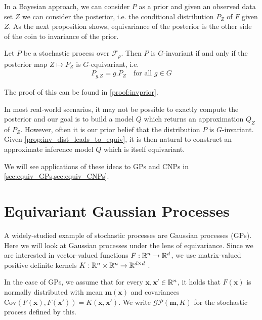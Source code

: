 In a Bayesian approach, we can consider $P$ as a prior and given an observed data set $Z$ we can consider the posterior, i.e. the conditional distribution $P_{Z}$ of $F$ given $Z$.
As the next proposition shows, equivariance of the posterior is the other side of the coin to invariance of the prior.
\begin{proposition}
	\label{prop:inv_dist_leads_to_equiv}
	Let $P$ be a stochastic process over $\mathcal{F}_\rho$.
	Then $P$ is $G$-invariant if and only if the posterior map $Z\mapsto P_Z$ is $G$-equivariant, i.e. \begin{align} P_{g.Z}=g.P_{Z} \quad\text{for all } g\in G \end{align} \end{proposition} The proof of this can be found in \cref{proof:invprior}.

In most real-world scenarios, it may not be possible to exactly compute the posterior and our goal is to build a model $Q$ which returns an approximation $Q_Z$ of $P_Z$.
However, often it is our prior belief that the distribution $P$ is $G$-invariant.
Given \cref{prop:inv_dist_leads_to_equiv}, it is then natural to construct an approximate inference model $Q$ which is itself equivariant.

We will see applications of these ideas to GPs and CNPs in \cref{sec:equiv_GPs,sec:equiv_CNPs}.

\section{Equivariant Gaussian Processes}
\label{sec:equiv_GPs}
A widely-studied example of stochastic processes are Gaussian processes (GPs).
Here we will look at Gaussian processes under the lens of equivariance.
Since we are interested in vector-valued functions $F:\mathbb{R}^n\to\mathbb{R}^d$, we use matrix-valued positive definite kernels $K:\mathbb{R}^n\times\mathbb{R}^n\to\mathbb{R}^{d\times d}$ \parencite{Review_matrix_kernels}.

In the case of GPs, we assume that for every $\mathbf{x},\mathbf{x}'\in\mathbb{R}^n$, it holds that $F(\mathbf{x})$ is normally distributed with mean $\mathbf{m}(\mathbf{x})$ and covariances $\text{Cov}(F(\mathbf{x}),F(\mathbf{x}'))=K(\mathbf{x},\mathbf{x}')$.
We write $\mathcal{GP}(\mathbf{m},K)$ for the stochastic process defined by this.

